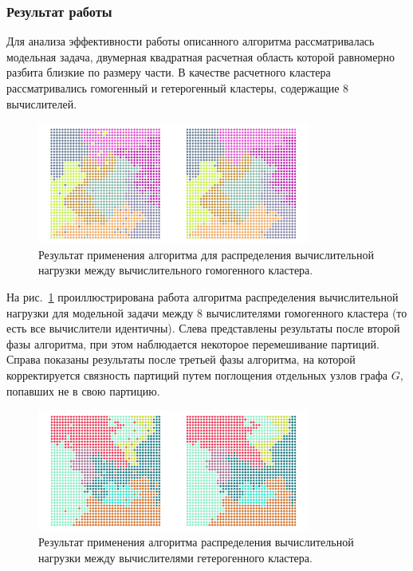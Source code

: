 \subsubsection{Результат работы}

Для анализа эффективности работы описанного алгоритма рассматривалась модельная задача, двумерная квадратная расчетная область которой равномерно разбита близкие по размеру части.
В качестве расчетного кластера рассматривались гомогенный и гетерогенный кластеры, содержащие 8 вычислителей.

\begin{figure}[ht]
\centering
\includegraphics[width=0.8\textwidth]{./pics/text_2_getero/res1small.png}
\caption{Результат применения алгоритма для распределения вычислительной нагрузки между вычислительного гомогенного кластера.}
\label{fig:text_2_getero_res1}
\end{figure}

На рис.~\ref{fig:text_2_getero_res1} проиллюстрирована работа алгоритма распределения вычислительной нагрузки для модельной задачи между 8 вычислителями гомогенного кластера (то есть все вычислители идентичны).
Слева представлены результаты после второй фазы алгоритма, при этом наблюдается некоторое перемешивание партиций.
Справа показаны результаты после третьей фазы алгоритма, на которой корректируется связность партиций путем поглощения отдельных узлов графа $G$, попавших не в свою партицию.

\begin{figure}[ht]
\centering
\includegraphics[width=0.8\textwidth]{./pics/text_2_getero/res2small.png}
\caption{Результат применения алгоритма распределения вычислительной нагрузки между вычислителями гетерогенного кластера.}
\label{fig:text_2_getero_res2}
\end{figure}

